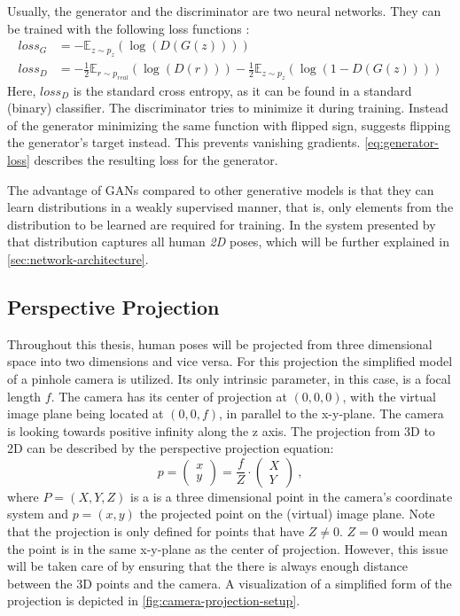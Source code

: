 Usually, the generator and the discriminator are two neural networks.
They can be trained with the following loss functions \cite{goodfellow17}:
\begin{align}
\label{eq:generator-loss}
loss_G &= -\mathbb{E}_{z\sim p_{z}}(\log(D(G(z)))) \\
\label{eq:discriminator-loss}
loss_D &= -\frac{1}{2}\mathbb{E}_{r\sim p_{real}}(\log(D(r))) - \frac{1}{2} \mathbb{E}_{z\sim p_{z}}(\log(1 - D(G(z))))
\end{align}
Here, $loss_D$ is the standard cross entropy, as it can be found in a standard (binary) classifier.
The discriminator tries to minimize it during training.
Instead of the generator minimizing the same function with flipped sign, \citet{goodfellow17} suggests flipping the generator's target instead.
This prevents vanishing gradients.
\autoref{eq:generator-loss} describes the resulting loss for the generator.

The advantage of GANs compared to other generative models is that they can learn distributions in a weakly supervised manner, that is, only elements from the distribution to be learned are required for training.
In the system presented by \citet{drover18} that distribution captures all human \emph{2D} poses, which will be further explained in \autoref{sec:network-architecture}.

\subsection{Perspective Projection}



Throughout this thesis, human poses will be projected from three dimensional space into two dimensions and vice versa.
For this projection the simplified model of a pinhole camera is utilized. 
Its only intrinsic parameter, in this case, is a focal length $f$.
The camera has its center of projection at $(0, 0, 0)$, with the virtual image plane being located at $(0, 0, f)$, in parallel to the x-y-plane.
The camera is looking towards positive infinity along the z axis.
The projection from 3D to 2D can be described by the perspective projection equation:
\begin{equation}
	\label{eq:perspective-projection}
	p = 
	\begin{pmatrix}
	x\\
	y
	\end{pmatrix}
	= \frac{f}{Z} \cdot 	
	\begin{pmatrix}
	X\\
	Y
	\end{pmatrix} \ ,
\end{equation}
where $P = (X, Y, Z)$ is a is a three dimensional point in the camera's coordinate system and $p = (x, y)$ the projected point on the (virtual) image plane.
Note that the projection is only defined for points that have $Z \neq 0$.
$Z = 0$ would mean the point is in the same x-y-plane as the center of projection.
However, this issue will be taken care of by ensuring that the there is always enough distance between the 3D points and the camera.
A visualization of a simplified form of the projection is depicted in \autoref{fig:camera-projection-setup}.

